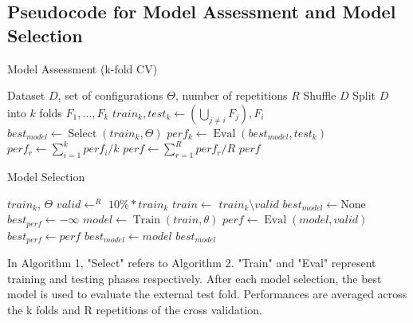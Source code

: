 \documentclass{article}
\begin{document}
\subsection*{Pseudocode for Model Assessment and Model Selection}

\begin{algorithm}[h]
    \caption{Model Assessment (k-fold CV)}
    \begin{algorithmic}[1]
        \REQUIRE Dataset $D$, set of configurations $\Theta$, number of repetitions $R$
            \STATE Shuffle $D$
            \STATE Split $D$ into $k$ folds $F_1, \ldots, F_k$
                \STATE $train_k, test_k \leftarrow (\bigcup\limits_{j \neq i} F_j), F_i$
                \STATE $best_{model} \leftarrow \operatorname{Select}(train_k, \Theta)$
                \STATE $perf_k \leftarrow \operatorname{Eval}(best_{model}, test_k)$
            \ENDFOR
            \STATE $perf_r \leftarrow \sum_{i=1}^k perf_i/k$
        \ENDFOR
        \STATE $perf \leftarrow \sum_{r=1}^R perf_r/R$
        \RETURN $perf$
    \end{algorithmic}
\end{algorithm}

\begin{algorithm}[h]
    \caption{Model Selection}
    \begin{algorithmic}[1]
        \REQUIRE $train_k$, $\Theta$
        \STATE $valid \leftarrow^R$ $10\% * train_k$
        \STATE $train \leftarrow$ $train_k \setminus valid$
        \STATE $best_{model} \leftarrow \text{None}$
        \STATE $best_{perf} \leftarrow -\infty$
        \FORALL{$\theta \in \Theta$}
            \STATE $model \leftarrow \operatorname{Train}(train, \theta)$
            \STATE $perf \leftarrow \operatorname{Eval}(model, valid)$
                \STATE $best_{perf} \leftarrow perf$
                \STATE $best_{model} \leftarrow model$
            \ENDIF
        \ENDFOR
        \RETURN $best_{model}$
    \end{algorithmic}
\end{algorithm}

In Algorithm 1, "Select" refers to Algorithm 2.
"Train" and "Eval" represent training and testing phases respectively.
After each model selection, the best model is used to evaluate the external test fold. Performances are averaged across the k folds and R repetitions of the cross validation.
\end{document}

